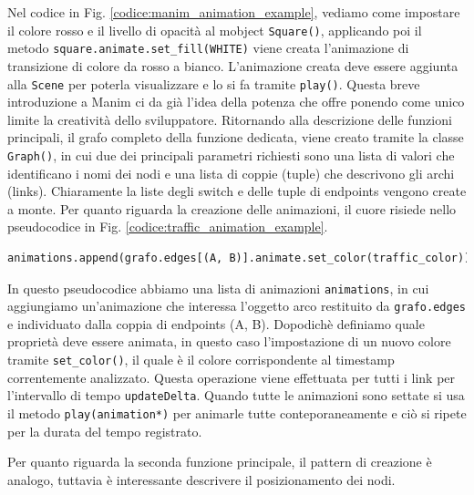 \documentclass[binding=0.6cm]{sapthesis}
\begin{document}
Nel codice in Fig. \ref{codice:manim_animation_example}, vediamo come impostare il colore rosso e il livello di opacità al mobject \lstinline|Square()|,
applicando poi il metodo \lstinline|square.animate.set_fill(WHITE)| viene creata l'animazione di transizione di colore da rosso a bianco.
L'animazione creata deve essere aggiunta alla \lstinline|Scene| per poterla visualizzare e lo si fa tramite \lstinline|play()|.
Questa breve introduzione a Manim ci da già l'idea della potenza che offre ponendo come unico limite la creatività dello sviluppatore.
Ritornando alla descrizione delle funzioni principali, il grafo completo della funzione dedicata, viene creato tramite la classe
\lstinline|Graph()|, in cui due dei principali parametri richiesti sono una lista di valori che identificano i nomi dei nodi e una lista di coppie (tuple)
che descrivono gli archi (links). Chiaramente la liste degli switch e delle tuple di endpoints vengono create a monte. Per quanto riguarda
la creazione delle animazioni, il cuore risiede nello pseudocodice in Fig. \ref{codice:traffic_animation_example}.


{\scriptsize %
\begin{lstlisting}[language=Python, caption={Creazione animazione traffico}, label={codice:traffic_animation_example}]
animations.append(grafo.edges[(A, B)].animate.set_color(traffic_color))
\end{lstlisting}
}
In questo pseudocodice abbiamo una lista di animazioni \lstinline|animations|, in cui aggiungiamo un'animazione che interessa l'oggetto arco 
restituito da \lstinline|grafo.edges| e individuato dalla coppia di endpoints (A, B). Dopodichè definiamo quale proprietà deve essere animata,
 in questo caso l'impostazione di un nuovo colore tramite \lstinline|set_color()|, il quale è il colore corrispondente al timestamp correntemente analizzato.
Questa operazione viene effettuata per tutti i link per l'intervallo di tempo \texttt{updateDelta}. Quando tutte le animazioni sono settate si usa
il metodo \lstinline|play(animation*)| per animarle tutte conteporaneamente e ciò si ripete per la durata del tempo registrato.

Per quanto riguarda la seconda funzione principale, il pattern di creazione è analogo, tuttavia è interessante descrivere il posizionamento dei nodi.
\end{document}
